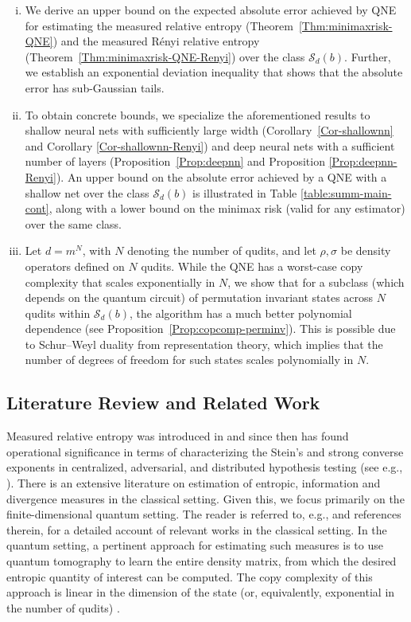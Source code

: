 \documentclass[a4paper,onecolumn,11pt,accepted=2026-05-12]{quantumarticle}
\newcommand{\cS}{\mathcal{S}}
\begin{document}
\begin{enumerate}[(i)]
    \item We derive an upper bound on the expected  absolute error achieved by QNE for estimating the measured relative entropy (Theorem~\ref{Thm:minimaxrisk-QNE}) and the measured R\'{e}nyi relative  entropy (Theorem~\ref{Thm:minimaxrisk-QNE-Renyi}) over the class $\cS_d(b)$. Further, we establish an exponential deviation inequality that shows that the absolute error has sub-Gaussian tails.
    
    \item To obtain concrete bounds, we specialize the aforementioned results to shallow neural nets with sufficiently large width (Corollary~\ref{Cor-shallownn} and Corollary \ref{Cor-shallownn-Renyi}) and deep neural nets with a sufficient number of layers (Proposition~\ref{Prop:deepnn} and Proposition \ref{Prop:deepnn-Renyi}). An upper bound on the absolute error achieved by a QNE with a shallow net over the class $\cS_d(b)$ is illustrated in Table \ref{table:summ-main-cont}, along with a lower bound on the minimax risk (valid for any estimator) over the same class.  
    
    \item Let $d=m^N$, with $N$ denoting the number of qudits, and let $\rho,\sigma$ be density operators defined on $N$ qudits. While the QNE has a worst-case copy complexity that scales exponentially in $N$, we show that for a subclass (which depends on the quantum circuit) of permutation invariant states across $N$ qudits within $\cS_d(b)$,  the algorithm has a much better polynomial dependence (see Proposition~\ref{Prop:copcomp-perminv}). This is possible due to Schur--Weyl duality from representation theory, which implies that the number of degrees of freedom for such states scales polynomially in $N$.
\end{enumerate}

\subsection{Literature Review and Related Work}
Measured relative entropy was introduced in  \cite{Donald1986,P09} and since then has found operational significance in terms of characterizing the Stein's and strong converse exponents in centralized, adversarial, and distributed hypothesis testing (see e.g.,  \cite{Hiai-Petz-1991,Hayashi_2002, Mosonyi2015QuantumHT,Brando2020AdversarialHT, RSB-IT-2025,SHCB-2025}). 
There is an extensive literature on estimation of entropic, information and divergence measures in the classical setting. Given this, we focus primarily on the finite-dimensional quantum setting. 
The reader is referred to, e.g.,  \cite{Verdu-2019,SK-2025} and references therein, for a detailed account of relevant works in the classical setting. In the quantum setting,  a pertinent approach for estimating such measures is to use quantum tomography to learn the entire density matrix, from which the desired entropic quantity of interest can be computed.  The copy complexity of this approach is linear in the dimension of the state (or, equivalently, exponential in the number of qudits) \cite{HHJWY16,wright2016learn,OW16,Yuen2023improvedsample}. 
\end{document}
